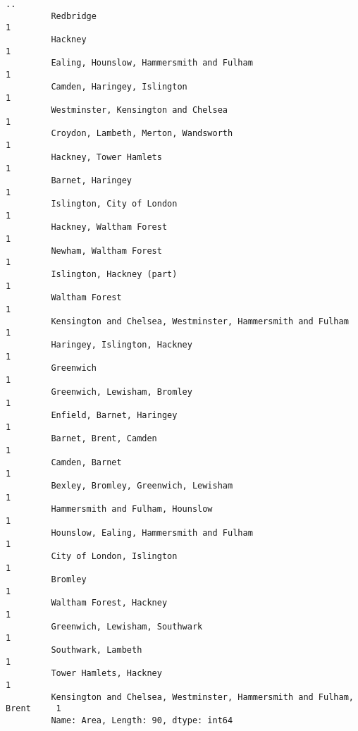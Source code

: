 \documentclass[11pt]{article}
\begin{document}
\begin{Verbatim}[commandchars=\\\{\}]
                                                                               ..
         Redbridge                                                              1
         Hackney                                                                1
         Ealing, Hounslow, Hammersmith and Fulham                               1
         Camden, Haringey, Islington                                            1
         Westminster, Kensington and Chelsea                                    1
         Croydon, Lambeth, Merton, Wandsworth                                   1
         Hackney, Tower Hamlets                                                 1
         Barnet, Haringey                                                       1
         Islington, City of London                                              1
         Hackney, Waltham Forest                                                1
         Newham, Waltham Forest                                                 1
         Islington, Hackney (part)                                              1
         Waltham Forest                                                         1
         Kensington and Chelsea, Westminster, Hammersmith and Fulham            1
         Haringey, Islington, Hackney                                           1
         Greenwich                                                              1
         Greenwich, Lewisham, Bromley                                           1
         Enfield, Barnet, Haringey                                              1
         Barnet, Brent, Camden                                                  1
         Camden, Barnet                                                         1
         Bexley, Bromley, Greenwich, Lewisham                                   1
         Hammersmith and Fulham, Hounslow                                       1
         Hounslow, Ealing, Hammersmith and Fulham                               1
         City of London, Islington                                              1
         Bromley                                                                1
         Waltham Forest, Hackney                                                1
         Greenwich, Lewisham, Southwark                                         1
         Southwark, Lambeth                                                     1
         Tower Hamlets, Hackney                                                 1
         Kensington and Chelsea, Westminster, Hammersmith and Fulham, Brent     1
         Name: Area, Length: 90, dtype: int64
\end{Verbatim}
            
\end{document}

